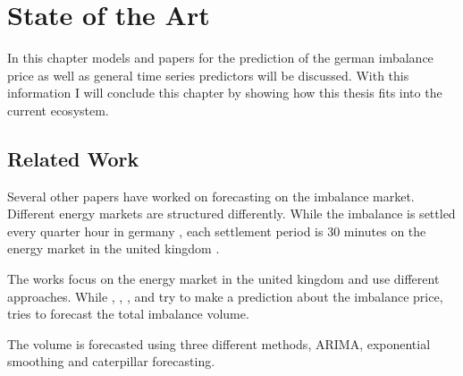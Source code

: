 \documentclass[class=scrbook, crop=false]{standalone}
\begin{document}
\chapter{State of the Art}
\label{Chapter::State_of_the_Art} %

In this chapter models and papers for the prediction of the german imbalance price as well as general time series predictors will be discussed. 
With this information I will conclude this chapter by showing how this thesis fits into the current ecosystem.

\section{Related Work}
\label{Section::Related_Work}

Several other papers have worked on forecasting on the imbalance market. Different energy markets are structured differently. While the imbalance is settled every quarter hour in germany \cite{narajewskiProbabilisticForecastingGerman2022}, each settlement period is 30 minutes on the energy market in the united kingdom \cite{limaBayesianPredictiveDistributions2023}.


The works \cite{limaBayesianPredictiveDistributions2023} \cite{ganeshForecastingImbalancePrice2024} \cite{garciaForecastingSystemImbalance2006} \cite{browellPredictingElectricityImbalance2022} \cite{lucasPriceForecastingBalancing2020} \cite{dengSeasonalityDeepLearning2024} focus on the energy market in the united kingdom and use different approaches. While \cite{limaBayesianPredictiveDistributions2023}, \cite{ganeshForecastingImbalancePrice2024}, \cite{browellPredictingElectricityImbalance2022}, \cite{lucasPriceForecastingBalancing2020} and \cite{dengSeasonalityDeepLearning2024} try to make a prediction about the imbalance price, \cite{garciaForecastingSystemImbalance2006} tries to forecast the total imbalance volume. 

The volume is forecasted using three different methods, ARIMA, exponential smoothing and caterpillar forecasting.
\end{document}
